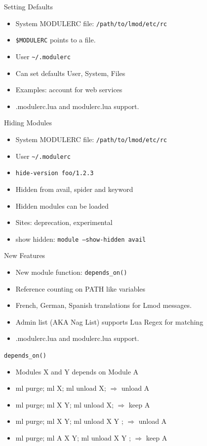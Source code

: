 \documentclass{beamer}
\begin{document}
\begin{frame}{Setting Defaults}
  \begin{itemize}
    \item System MODULERC file: \texttt{/path/to/lmod/etc/rc}
    \item \texttt{\$MODULERC} points to a file.
    \item User \texttt{\textasciitilde/.modulerc}
    \item Can set defaults User, System, Files
    \item Examples: account for web services
    \item .modulerc.lua and modulerc.lua support.
  \end{itemize}
\end{frame}

\begin{frame}{Hiding Modules}
  \begin{itemize}
    \item System MODULERC file: \texttt{/path/to/lmod/etc/rc}
    \item User \texttt{\textasciitilde/.modulerc}
    \item \texttt{\color{blue}hide-version foo/1.2.3}
    \item Hidden from avail, spider and keyword
    \item Hidden modules can be loaded
    \item Sites: deprecation, experimental
    \item show hidden: \texttt{module --show-hidden avail}
  \end{itemize}
\end{frame}


\begin{frame}{New Features}
  \begin{itemize}
    \item New module function: \texttt{depends\_on()}
    \item Reference counting on PATH like variables
    \item French, German, Spanish translations for Lmod messages.
    \item Admin list (AKA Nag List) supports Lua Regex for matching
    \item .modulerc.lua and modulerc.lua support.
  \end{itemize}
\end{frame}

\begin{frame}{\texttt{depends\_on()}}
  \begin{itemize}
    \item Modules X and Y depends on Module A
    \item ml purge; ml X; ml unload X;      $\Rightarrow$ unload A
    \item ml purge; ml X Y; ml unload X;    $\Rightarrow$ keep A
    \item ml purge; ml X Y; ml unload X Y ; $\Rightarrow$ unload A
    \item ml purge; ml A X Y; ml unload X Y ; $\Rightarrow$ keep A
  \end{itemize}
\end{frame}
\end{document}
